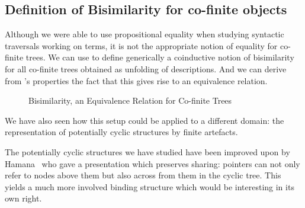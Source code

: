 \subsection{Definition of Bisimilarity for co-finite objects}

Although we were able to use propositional equality when studying
syntactic traversals working on terms, it is not the appropriate
notion of equality for co-finite trees. We can use  to
define generically a coinductive notion of bisimilarity for all
co-finite trees obtained as unfolding of descriptions. And we
can derive from 's properties the fact that this gives
rise to an equivalence relation.

\begin{figure}[h]
\caption{Bisimilarity, an Equivalence Relation for Co-finite Trees}
\end{figure}





We have also seen how this setup
could be applied to a different domain: the representation of potentially
cyclic structures by finite artefacts.


The potentially cyclic structures we have studied have been improved
upon by Hamana~\citeyear{Hamana2009} who gave a presentation which
preserves sharing: pointers can not only refer to nodes above them
but also across from them in the cyclic tree. This yields a much more
involved binding structure which would be interesting in its own right.
